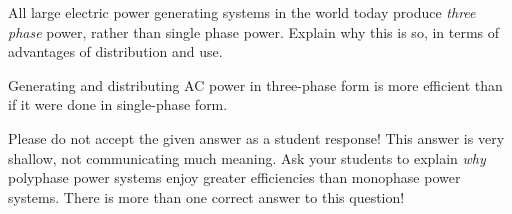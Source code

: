

All large electric power generating systems in the world today produce {\it three phase} power, rather than single phase power.  Explain why this is so, in terms of advantages of distribution and use.







Generating and distributing AC power in three-phase form is more efficient than if it were done in single-phase form.







Please do not accept the given answer as a student response!  This answer is very shallow, not communicating much meaning.  Ask your students to explain {\it why} polyphase power systems enjoy greater efficiencies than monophase power systems.  There is more than one correct answer to this question!




